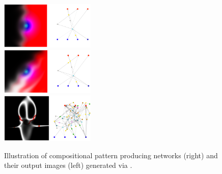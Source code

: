 \begin{figure}
\begin{center}
\label{fig:cppn_images}
  \includegraphics[width=0.4\textwidth]{img/parent} \\
  \includegraphics[width=0.4\textwidth]{img/offspring} \\
  \includegraphics[width=0.4\textwidth]{img/better_goast}
  \end{center}
  \captionsetup{singlelinecheck=off,justification=raggedright}

  \caption{Illustration of compositional pattern producing networks (right) and their output images (left) generated via \cite{Ha2015Neurogram}.}
\end{figure}